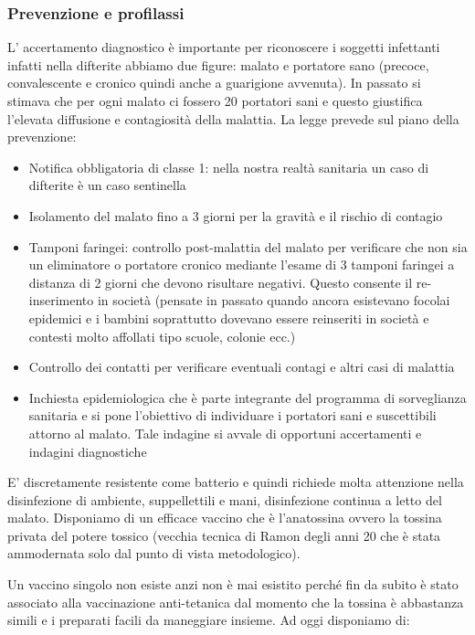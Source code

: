 \subsubsection{Prevenzione e profilassi}

  L' accertamento diagnostico è importante per riconoscere i soggetti
  infettanti infatti nella difterite abbiamo due figure: malato e
  portatore sano (precoce, convalescente e cronico quindi anche a
  guarigione avvenuta). In passato si stimava che per ogni malato ci
  fossero 20 portatori sani e questo giustifica l'elevata diffusione e
  contagiosità della malattia. La legge prevede sul piano della
  prevenzione:

\begin{itemize}
\item
  Notifica obbligatoria di classe 1: nella nostra realtà sanitaria un
  caso di difterite è un caso sentinella
\item
  Isolamento del malato fino a 3 giorni per la gravità e il rischio di
  contagio
\item
  Tamponi faringei: controllo post-malattia del malato per verificare
  che non sia un eliminatore o portatore cronico mediante l'esame di 3
  tamponi faringei a distanza di 2 giorni che devono risultare negativi.
  Questo consente il re-inserimento in società (pensate in passato
  quando ancora esistevano focolai epidemici e i bambini soprattutto
  dovevano essere reinseriti in società e contesti molto affollati tipo
  scuole, colonie ecc.)
\item
  Controllo dei contatti per verificare eventuali contagi e altri casi
  di malattia
\item
  Inchiesta epidemiologica che è parte integrante del programma di
  sorveglianza sanitaria e si pone l'obiettivo di individuare i
  portatori sani e suscettibili attorno al malato. Tale indagine si
  avvale di opportuni accertamenti e indagini diagnostiche
\end{itemize}
  E' discretamente resistente come batterio e quindi richiede molta
  attenzione nella disinfezione di ambiente, suppellettili e mani,
  disinfezione continua a letto del malato. Disponiamo di un efficace
  vaccino che è l'anatossina ovvero la tossina privata del potere
  tossico (vecchia tecnica di Ramon degli anni 20 che è stata
  ammodernata solo dal punto di vista metodologico).

  Un vaccino singolo non esiste anzi non è mai esistito perché fin da
  subito è stato associato alla vaccinazione anti-tetanica dal momento
  che la tossina è abbastanza simili e i preparati facili da maneggiare
  insieme. Ad oggi disponiamo di:

